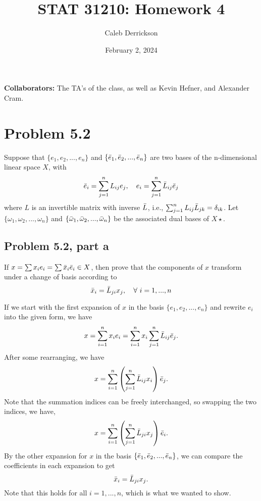 

\title{STAT 31210: Homework 4}
\author{Caleb Derrickson}
\date{February 2, 2024}


\onehalfspacing
\maketitle
\allowdisplaybreaks
{\color{cit}\vspace{2mm}\noindent\textbf{Collaborators:}} The TA's of the class, as well as Kevin Hefner, and Alexander Cram.

\tableofcontents

\newpage
\section{Problem 5.2}
Suppose that $\{ e_1, e_2, ..., e_n\}$ and $\{\Bar{e}_1, \Bar{e}_2, ..., \Bar{e}_n\}$ are two bases of the n-dimensional linear space $X$, with
\[\Bar{e}_i = \sum_{j = 1}^nL_{ij}e_j, \quad e_i = \sum_{j = 1}^n \Bar{L}_{ij}\Bar{e}_j\]
where $L$ is an invertible matrix with inverse $\Bar{L}$, i.e., $\sum_{j = 1}^n L_{ij}\Bar{L}_{jk} = \delta_{ik}$. Let $\{\omega_1, \omega_2, ..., \omega_n\}$ and $\{ \Bar{\omega}_1, \Bar{\omega}_2, ..., \Bar{\omega}_n\}$ be the associated dual bases of $X\star$.
\subsection{Problem 5.2, part a}
If $x = \sum x_ie_i = \sum \Bar{x}_i \Bar{e}_i \in X$, then prove that the components of $x$ transform under a change of basis according to 
\[\Bar{x}_i = \Bar{L}_{ji}x_j, \quad \forall \ i = 1, ..., n\]
\partbreak
\begin{solution}

    If we start with the first expansion of $x$ in the basis $\{ e_1, e_2, ..., e_n\}$ and rewrite $e_i$ into the given form, we have 
    \[x = \sum_{i = 1}^n x_i e_i = \sum_{i = 1}^n x_i \sum_{j = 1}^n \Bar{L}_{ij}\Bar{e}_j.\]
    After some rearranging, we have
    \[x = \sum_{i = 1}^n \left(\sum_{j = 1}^n \Bar{L}_{ij}x_i \right)\Bar{e}_j.\]
    Note that the summation indices can be freely interchanged, so swapping the two indices, we have,
    \[x = \sum_{i = 1}^n \left(\sum_{j = 1}^n \Bar{L}_{ji}x_j \right)\Bar{e}_i.\]
    By the other expansion for $x$ in the basis $\{\Bar{e}_1, \Bar{e}_2, ..., \Bar{e}_n\}$, we can compare the coefficients in each expansion to get 
    \[\Bar{x}_i = \Bar{L}_{ji}x_j. \]
    Note that this holds for all $i = 1, ..., n$, which is what we wanted to show.
\end{solution}

